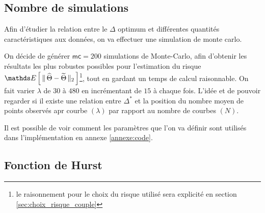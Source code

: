 
\subsection{Nombre de simulations}

Afin d'étudier la relation entre le $\Delta$ optimum et différentes quantités caractéristiques aux données, on va effectuer une simulation de monte carlo.

On décide de générer $\mathsf{mc} = 200$ simulations de Monte-Carlo, afin d'obtenir les résultats les plus robustes possibles pour l'estimation du risque $\esperance{\distnorme 2 {\widehat \Theta} {\widetilde \Theta}}$\footnote{le raisonnement pour le choix du risque utilisé sera explicité en section \ref{sec:choix_risque_couple}}, tout en gardant un temps de calcul raisonnable. On fait varier $\lambda$ de $30$ à $480$ en incrémentant de $15$ à chaque fois. L'idée et de pouvoir regarder si il existe une relation entre $\Delta^*$ et la position du nombre moyen de points observés apr courbe $(\lambda)$ par rapport au nombre de courbes $(N)$.

\smallskip

Il est possible de voir comment les paramètres que l'on va définir sont utilisés dans l'implémentation en annexe \ref{annexe:code}.


\newcommand{\tlnm}{T^{[\lambda]}_{n}[m]}
\newcommand{\mset}{\llbracket 1, M_n \rrbracket}
\newcommand{\nset}{\llbracket 1, N \rrbracket}
\newcommand{\lbdset}{\llbracket 30, 45, \dots , 480 \rrbracket}
\newcommand{\genxset}{\bigl(\tlnm, X_n(\tlnm)\bigr)_{m \in \mset}}
\newcommand{\simset}{\left\{ \genxset \, : \, n \in \nset, \, \lambda \& N \textsf{ fixés } \right\}}
\newcommand{\simsetall}{\left\{ \genxset \, : \, N \in \overrightarrow N, \, \lambda \in \lbdset, \, n \in \nset \right\}}

\subsection{Fonction de Hurst}
\label{sec:sim_fcn_hurst}

